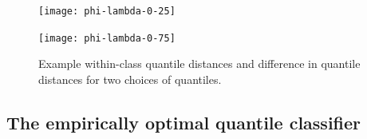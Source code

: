 \begin{figure}[ht]
  \caption[cccc]{Example within-class quantile distances and difference in
    quantile distances for two choices of quantiles.
  }

  \label{fig:phi-lambda}
  \vspace{5mm}
  
  \begin{minipage}[t]{0.49\linewidth}
    \centering
    \texttt{[image: phi-lambda-0-25]}
  \end{minipage}
  \begin{minipage}[t]{0.49\linewidth}
    \centering
    \texttt{[image: phi-lambda-0-75]}
  \end{minipage}
  
\end{figure}




\subsection{The empirically optimal quantile classifier}
\label{sec:empirical-classifier}

